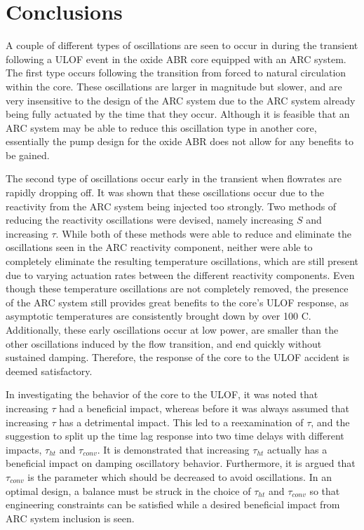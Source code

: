 \documentclass[11pt, oneside]{article}   	%
\begin{document}
\section{Conclusions}

A couple of different types of oscillations are seen to occur in during the transient following a ULOF event in the oxide ABR core equipped with an ARC system.
The first type occurs following the transition from forced to natural circulation within the core.
These oscillations are larger in magnitude but slower, and are very insensitive to the design of the ARC system due to the ARC system already being fully actuated by the time that they occur.
Although it is feasible that an ARC system may be able to reduce this oscillation type in another core, essentially the pump design for the oxide ABR does not allow for any benefits to be gained.

The second type of oscillations occur early in the transient when flowrates are rapidly dropping off.
It was shown that these oscillations occur due to the reactivity from the ARC system being injected too strongly.
Two methods of reducing the reactivity oscillations were devised, namely increasing $S$ and increasing $\tau$. 
While both of these methods were able to reduce and eliminate the oscillations seen in the ARC reactivity component, neither were able to completely eliminate the resulting temperature oscillations, which are still present due to varying actuation rates between the different reactivity components.
Even though these temperature oscillations are not completely removed, the presence of the ARC system still provides great benefits to the core's ULOF response, as asymptotic temperatures are consistently brought down by over 100 C.
Additionally, these early oscillations occur at low power, are smaller than the other oscillations induced by the flow transition, and end quickly without sustained damping.
Therefore, the response of the core to the ULOF accident is deemed satisfactory.

In investigating the behavior of the core to the ULOF, it was noted that increasing $\tau$ had a beneficial impact, whereas before it was always assumed that increasing $\tau$ has a detrimental impact.
This led to a reexamination of $\tau$, and the suggestion to split up the time lag response into two time delays with different impacts, $\tau_{ht}$ and $\tau_{conv}$.
It is demonstrated that increasing $\tau_{ht}$ actually has a beneficial impact on damping oscillatory behavior.
Furthermore, it is argued that $\tau_{conv}$ is the parameter which should be decreased to avoid oscillations.
In an optimal design, a balance must be struck in the choice of $\tau_{ht}$ and $\tau_{conv}$ so that engineering constraints can be satisfied while a desired beneficial impact from ARC system inclusion is seen.
\end{document}
